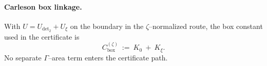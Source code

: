 \documentclass[11pt]{article}
\newif\ifshownumerics
\theoremstyle{definition}
\theoremstyle{remark}
\begin{document}
\paragraph{Carleson box linkage.}
With $U=U_{\det_2}+U_{\xi}$ on the boundary in the $\zeta$–normalized route, the box constant used in the certificate is
\[
  C_{\mathrm{box}}^{(\zeta)}\ :=\ K_0\ +\ K_\xi.
\]
No separate $\Gamma$–area term enters the certificate path.

\ifshownumerics
\paragraph{Numeric instantiation (diagnostic; gated).}
All concrete values (audited constants for $K_0$, $K_\xi$, the $\zeta$–side box constant $C_{\mathrm{box}}^{(\zeta)}$, the evaluation of $C_\psi^{(H^1)}$, and the locked $M_\psi$) are collected for reproducibility; the proof of (P+) uses only the CR–Green right-hand side with the box constant.
\begin{itemize}
  \item \textbf{Window:} fixed $C^\infty$ even $\psi$ with $\psi\equiv 1$ on $[-1,1]$ and $\mathrm{supp}\,\psi\subseteq[-2,2]$, and $\varphi_L(t)=L^{-1}\psi(t/L)$.
  \item \textbf{Poisson lower bound.} Using the closed form for the plateau and monotonicity, $c_0(\psi)\ge 0.1762081912$.
  \item \textbf{Archimedean term.} In the $\zeta$-normalized route with the Blaschke compensator at $s=1$, $C_\Gamma=0$.
  \item \textbf{Hilbert term.} We retain $C_H(\psi)$ symbolically; an explicit envelope can be inserted.
  \item \textbf{Inequality form.} With $M_\psi= (4/\pi)\,C_\psi^{(H^1)}\,\sqrt{C_{\mathrm{box}}^{(\zeta)}}$, the display $\frac{(2/\pi)\,M_\psi}{c_0(\psi)}<\frac{\pi}{2}$ is diagnostic.
\end{itemize}
 
\fi
\end{document}
